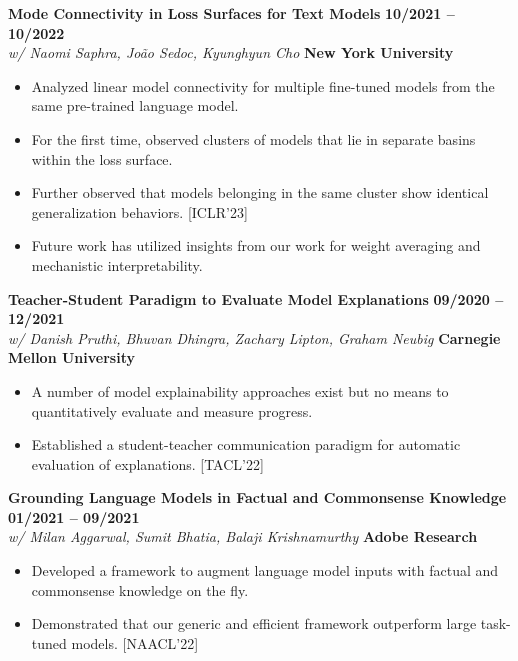 \documentclass[10pt,letterpaper]{article}
\begin{document}
\textbf{Mode Connectivity in Loss Surfaces for Text Models} \hfill \textbf{10/2021 -- 10/2022} \\
\textit{w/ Naomi Saphra, Jo\~ao Sedoc, Kyunghyun Cho} \hfill \textcolor{accent}{\textbf{New York University}}
\begin{itemize}
    \item Analyzed linear model connectivity for multiple fine-tuned models from the same pre-trained language model.
    \item For the first time, observed clusters of models that lie in separate basins within the loss surface.
    \item Further observed that models belonging in the same cluster show identical generalization behaviors. [ICLR'23]
    \item Future work has utilized insights from our work for weight averaging and mechanistic interpretability.
\end{itemize}

\vspace{3pt}

\textbf{Teacher-Student Paradigm to Evaluate Model Explanations} \hfill \textbf{09/2020 -- 12/2021} \\
\textit{w/ Danish Pruthi, Bhuvan Dhingra, Zachary Lipton, Graham Neubig} \hfill \textcolor{accent}{\textbf{Carnegie Mellon University}}
\begin{itemize}
    \item A number of model explainability approaches exist but no means to quantitatively evaluate and measure progress.
    \item Established a student-teacher communication paradigm for automatic evaluation of explanations. [TACL'22]
\end{itemize}

\vspace{3pt}

\textbf{Grounding Language Models in Factual and Commonsense Knowledge} \hfill \textbf{01/2021 -- 09/2021} \\
\textit{w/ Milan Aggarwal, Sumit Bhatia, Balaji Krishnamurthy} \hfill \textcolor{accent}{\textbf{Adobe Research}}
\begin{itemize}
    \item Developed a framework to augment language model inputs with factual and commonsense knowledge on the fly.
    \item Demonstrated that our generic and efficient framework outperform large task-tuned models. [NAACL'22]
\end{itemize}
\end{document}
